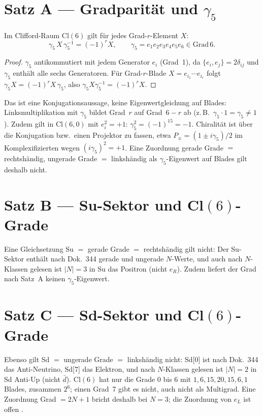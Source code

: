 \section{Satz A --- Gradparität und $\gamma_5$}

\begin{theorem}
Im Clifford-Raum $\mathrm{Cl}(6)$ gilt für jedes Grad-$r$-Element $X$:
\[
  \gamma_5 \, X \, \gamma_5^{-1} = (-1)^r X, \qquad
  \gamma_5 = e_1 e_2 e_3 e_4 e_5 e_6 \in \mathrm{Grad}\,6.
\]
\end{theorem}

\begin{proof}
$\gamma_5$ antikommutiert mit jedem Generator $e_i$ (Grad~1),
da $\{e_i, e_j\} = 2\delta_{ij}$ und $\gamma_5$ enthält alle sechs Generatoren.
Für Grad-$r$-Blade $X = e_{i_1}\cdots e_{i_r}$ folgt
$\gamma_5 X = (-1)^r X\,\gamma_5$, also $\gamma_5 X \gamma_5^{-1} = (-1)^r X$.
\end{proof}

Das ist eine Konjugationsaussage, keine Eigenwertgleichung auf Blades:
Linksmultiplikation mit $\gamma_5$ bildet Grad~$r$ auf Grad~$6-r$ ab
(z.\,B.\ $\gamma_5\cdot 1 = \gamma_5 \neq 1$). Zudem gilt in Cl$(6,0)$ mit
$e_i^2 = +1$: $\gamma_5^2 = (-1)^{15} = -1$. Chiralität ist über die
Konjugation bzw.\ einen Projektor zu fassen, etwa $P_\pm = (1 \pm i\gamma_5)/2$
im Komplexifizierten wegen $(i\gamma_5)^2 = +1$. Eine Zuordnung
\glqq gerade Grade $=$ rechtshändig, ungerade Grade $=$ linkshändig\grqq{}
als $\gamma_5$-Eigenwert auf Blades gilt deshalb nicht.

\section{Satz B --- Su-Sektor und Cl$(6)$-Grade}

Eine Gleichsetzung \glqq Su $=$ gerade Grade $=$ rechtshändig\grqq{} gilt nicht:
Der Su-Sektor enthält nach Dok.~344 gerade und ungerade $N$-Werte, und auch
nach $N$-Klassen gelesen ist $|N| = 3$ in Su das Positron (nicht $e_R$).
Zudem liefert der Grad nach Satz~A keinen $\gamma_5$-Eigenwert.

\section{Satz C --- Sd-Sektor und Cl$(6)$-Grade}

Ebenso gilt \glqq Sd $=$ ungerade Grade $=$ linkshändig\grqq{} nicht: Sd[0] ist
nach Dok.~344 das Anti-Neutrino, Sd[7] das Elektron, und nach $N$-Klassen
gelesen ist $|N| = 2$ in Sd Anti-Up (nicht $\bar d$). Cl$(6)$ hat nur die
Grade 0 bis 6 mit $1,6,15,20,15,6,1$ Blades, zusammen $2^6$; einen Grad~7
gibt es nicht, auch nicht als Multigrad. Eine Zuordnung Grad $= 2N+1$ bricht
deshalb bei $N = 3$; die Zuordnung von $e_L$ ist offen \SM.

